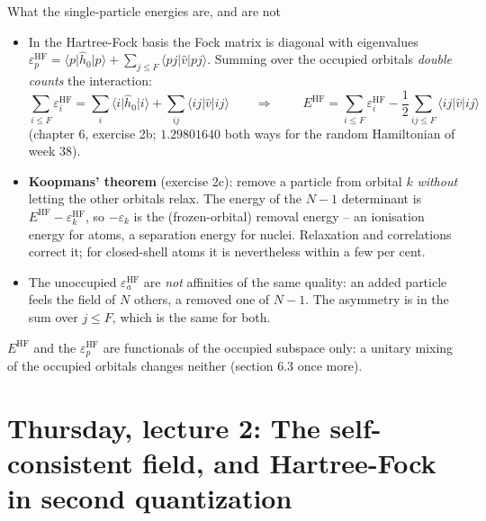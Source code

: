 \documentclass[aspectratio=169,10pt]{beamer}
\newcommand{\mbbox}[1]{%
  \begin{tcolorbox}[colback=paleblue,colframe=uioblue,title={\bfseries Many-body connection}]
  #1
  \end{tcolorbox}}
\newcommand{\element}[3]{\langle #1\vert #2\vert #3\rangle}
\begin{document}
\begin{frame}{What the single-particle energies are, and are not}
  \footnotesize
  \begin{itemize}
    \item In the Hartree-Fock basis the Fock matrix is diagonal with eigenvalues $\varepsilon_p^{\mathrm{HF}}=\element{p}{\hat{h}_0}{p}+\sum_{j\le F}\element{pj}{\hat{v}}{pj}$. Summing over the occupied orbitals \emph{double counts} the interaction:
    \[
      \sum_{i\le F}\varepsilon_i^{\mathrm{HF}}=\sum_i\element{i}{\hat{h}_0}{i}+\sum_{ij}\element{ij}{\hat{v}}{ij}
      \qquad\Longrightarrow\qquad
      \boxed{\;E^{\mathrm{HF}}=\sum_{i\le F}\varepsilon_i^{\mathrm{HF}}-\frac12\sum_{ij\le F}\element{ij}{\hat{v}}{ij}\;}
    \]
    (chapter 6, exercise 2b; $1.29801640$ both ways for the random Hamiltonian of week 38).
    \item \textbf{Koopmans' theorem} (exercise 2c): remove a particle from orbital $k$ \emph{without} letting the other orbitals relax. The energy of the $N-1$ determinant is $E^{\mathrm{HF}}-\varepsilon_k^{\mathrm{HF}}$, so $-\varepsilon_k$ is the (frozen-orbital) removal energy -- an ionisation energy for atoms, a separation energy for nuclei. Relaxation and correlations correct it; for closed-shell atoms it is nevertheless within a few per cent.
    \item The unoccupied $\varepsilon_a^{\mathrm{HF}}$ are \emph{not} affinities of the same quality: an added particle feels the field of $N$ others, a removed one of $N-1$. The asymmetry is in the sum over $j\le F$, which is the same for both.
  \end{itemize}
  \mbbox{$E^{\mathrm{HF}}$ and the $\varepsilon_p^{\mathrm{HF}}$ are functionals of the occupied subspace only: a unitary mixing of the occupied orbitals changes neither (section 6.3 once more).}
\end{frame}

\section{Thursday, lecture 2: The self-consistent field, and Hartree-Fock in second quantization}
\end{document}
